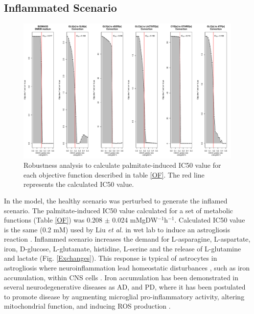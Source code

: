 \subsection*{Inflammated Scenario}
\begin{figure}[h]
\begin{center}
\includegraphics[width=\textwidth]{neuroprotective/IC50}
\end{center}
\caption{Robustness analysis to calculate palmitate-induced IC50 value for each objective function described in table \ref{OF}. The red line represents the calculated IC50 value.}
\end{figure}

In the model, the healthy scenario was perturbed to generate the inflamed scenario. The palmitate-induced IC50 value calculated for a set of metabolic functions (Table \ref{OF}) was 0.208 $\pm$ 0.024 mMgDW$^{-1}$h$^{-1}$. Calculated IC50 value is the same (0.2 mM) used by Liu \emph{et al.} in wet lab to induce an astrogliosis reaction \cite{Liu2013}. Inflammed scenario increases the demand for L-asparagine, L-aspartate, iron, D-glucose, L-glutamate, histidine, L-serine and the release of L-glutamine and lactate (Fig. \ref{Exchanges}). This response is typical of astrocytes in astrogliosis where neuroinflammation lead homeostatic disturbances \cite{Rangel-Aldao2015}, such as iron accumulation, within CNS cells \cite{Jha2016}. Iron accumulation has been demonstrated in several neurodegenerative diseases as AD, and PD, where it has been postulated to promote disease by augmenting microglial pro-inflammatory activity, altering mitochondrial function, and inducing ROS production \cite{Williams2012}.\\

